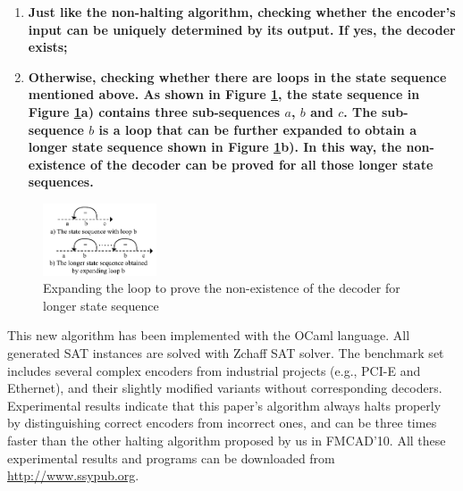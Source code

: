 \documentclass[journal]{IEEEtran}
\begin{document}
\begin{enumerate}
 \item \textbf{Just like the non-halting algorithm\cite{ShengYuShen:iccad09,ShengYuShen:tcad},
       checking whether the encoder's input can be uniquely determined by its output.
      If yes, the decoder exists;}
 \item \textbf{Otherwise,
       checking whether there are loops in the state sequence mentioned above.
       As shown in Figure \ref{doubleloop_unfold_cmp_simple},
       the state sequence in Figure \ref{doubleloop_unfold_cmp_simple}a) contains three sub-sequences $a$, $b$ and $c$.
       The sub-sequence $b$ is a loop
       that can be further expanded to obtain a longer state sequence shown in Figure \ref{doubleloop_unfold_cmp_simple}b).
       In this way,
       the non-existence of the decoder can be proved for all those longer state sequences.}
\end{enumerate}

\begin{figure}[b]
\begin{center}
\includegraphics[width=0.3\textwidth]{doubleloop_unfold_cmp_simple}
\end{center}
\caption{Expanding the loop to prove the non-existence of the decoder for longer state sequence}
  \label{doubleloop_unfold_cmp_simple}
\end{figure}

This new algorithm has been implemented with the OCaml language.
All generated SAT instances are solved with Zchaff SAT solver\cite{CHAFF}.
The benchmark set includes several complex encoders from industrial projects
(e.g.,
PCI-E\cite{PCIESPEC} and Ethernet\cite{IEEE80232002}),
and their slightly modified variants without corresponding decoders.
Experimental results indicate that
this paper's algorithm always halts properly by distinguishing correct encoders from incorrect ones,
and can be three times faster than the other halting algorithm\cite{ShengYuShen:fmcad10} proposed by us in FMCAD'10.
All these experimental results and programs can be downloaded from \url{http://www.ssypub.org}.
\end{document}
